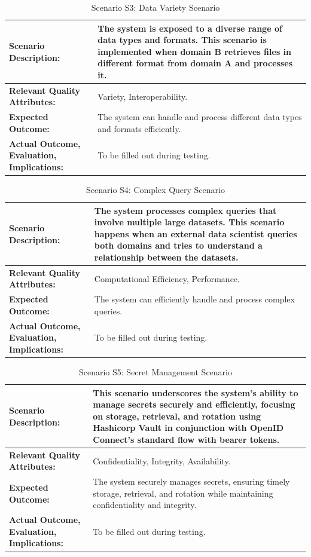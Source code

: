 \documentclass[preprint,12pt]{elsarticle}
\begin{document}
\begin{table}[tbp]
  \caption{Scenario S3: Data Variety Scenario}
  \begin{tabularx}{\textwidth}{|>{\raggedright\arraybackslash}p{5cm}|X|}
  \hline
  \textbf{Scenario Description:} & The system is exposed to a diverse range of data types and formats. This scenario is implemented when domain B retrieves files in different format from domain A and processes it. \\
  \hline
  \textbf{Relevant Quality Attributes:} & Variety, Interoperability. \\
  \hline
  \textbf{Expected Outcome:} & The system can handle and process different data types and formats efficiently. \\
  \hline
  \textbf{Actual Outcome, Evaluation, Implications:} & To be filled out during testing. \\
  \hline
  \end{tabularx}
\end{table}

\begin{table}[tbp]
  \caption{Scenario S4: Complex Query Scenario}
  \begin{tabularx}{\textwidth}{|>{\raggedright\arraybackslash}p{5cm}|X|}
  \hline
  \textbf{Scenario Description:} & The system processes complex queries that involve multiple large datasets. This scenario happens when an external data scientist queries both domains and tries to understand a relationship between the datasets. \\
  \hline
  \textbf{Relevant Quality Attributes:} & Computational Efficiency, Performance. \\
  \hline
  \textbf{Expected Outcome:} & The system can efficiently handle and process complex queries. \\
  \hline
  \textbf{Actual Outcome, Evaluation, Implications:} & To be filled out during testing. \\
  \hline
  \end{tabularx}
\end{table}

\begin{table}[tbp]
  \caption{Scenario S5: Secret Management Scenario}
  \begin{tabularx}{\textwidth}{|>{\raggedright\arraybackslash}p{5cm}|X|}
  \hline
  \textbf{Scenario Description:} & This scenario underscores the system's ability to manage secrets securely and efficiently, focusing on storage, retrieval, and rotation using Hashicorp Vault in conjunction with OpenID Connect's standard flow with bearer tokens. \\
  \hline
  \textbf{Relevant Quality Attributes:} & Confidentiality, Integrity, Availability. \\
  \hline
  \textbf{Expected Outcome:} & The system securely manages secrets, ensuring timely storage, retrieval, and rotation while maintaining confidentiality and integrity. \\
  \hline
  \textbf{Actual Outcome, Evaluation, Implications:} & To be filled out during testing. \\
  \hline
  \end{tabularx}
\end{table}
\end{document}
